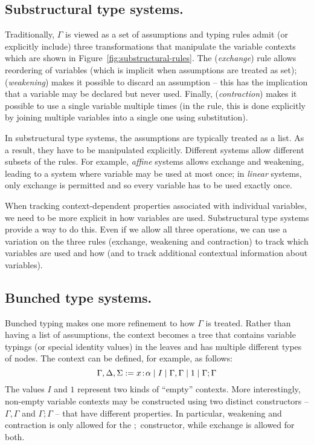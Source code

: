
\subsection{Substructural type systems.}

Traditionally, $\Gamma$ is viewed as a set of assumptions and typing rules admit (or explicitly
include) three transformations that manipulate the variable contexts which are shown in
Figure~\ref{fig:substructural-rules}. The (\emph{exchange}) rule allows reordering of variables
(which is implicit when assumptions are treated as set); (\emph{weakening}) makes it possible
to discard an assumption -- this has the implication that a variable may be declared but never
used. Finally, (\emph{contraction}) makes it possible to use a single variable multiple times
(in the rule, this is done explicitly by joining multiple variables into a single one using
substitution).

In substructural type systems, the assumptions are typically treated as a list. As a result,
they have to be manipulated explicitly. Different systems allow different subsets of the rules.
For example, \emph{affine} systems allows exchange and weakening, leading to a system where
variable may be used at most once; in \emph{linear} systems, only exchange is permitted and so
every variable has to be used exactly once.

When tracking context-dependent properties associated with individual variables, we need to
be more explicit in how variables are used. Substructural type systems provide a way to do this.
Even if we allow all three operations, we can use a variation on the three rules (exchange,
weakening and contraction) to track which variables are used and how (and to track additional
contextual information about variables).


\subsection{Bunched type systems.}
Bunched typing makes one more refinement to how $\Gamma$ is treated. Rather than having a list
of assumptions, the context becomes a tree that contains variable typings (or special identity
values) in the leaves and has multiple different types of nodes. The context can be defined,
for example, as follows:
%
\begin{equation*}
\Gamma, \Delta, \Sigma := x\!:\!\alpha \; | \; I \; | \; \Gamma, \Gamma \; | \; 1 \; | \; \Gamma; \Gamma
\end{equation*}
%
The values $I$ and $1$ represent two kinds of ``empty'' contexts. More interestingly, non-empty
variable contexts may be constructed using two distinct constructors -- $\Gamma, \Gamma$ and
$\Gamma; \Gamma$ -- that have different properties. In particular, weakening and contraction is
only allowed for the $;$ constructor, while exchange is allowed for both.

